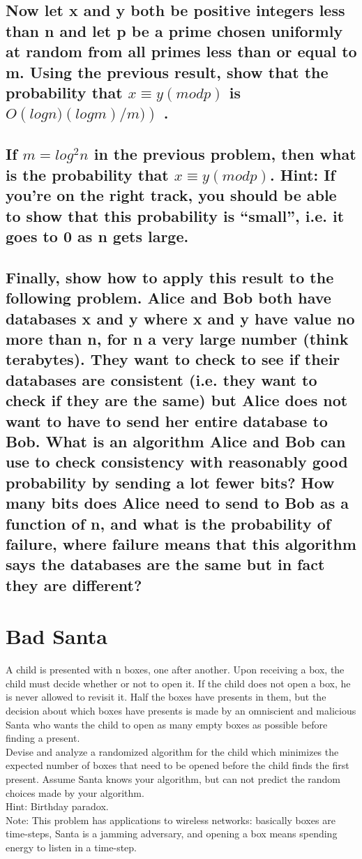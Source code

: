 \documentclass[titlepage]{article}\usepackage[]{graphicx}\usepackage[]{color}
\begin{document}
\subsection{ Now let x and y both be positive integers less than n and let p be a prime
chosen uniformly at random from all primes less than or equal to m. Using the
previous result, show that the probability that $ x ≡ y (mod p)$  is $ O\left( log
n)(log m)/m)\right)$ . }

\subsection{ If $ m = log^2 n$  in the previous problem, then what is the probability that
$x ≡ y (mod p)$. Hint: If you’re on the right track, you should be able to show
that this probability is ``small'', i.e. it goes to 0 as n gets large. }

\subsection{ Finally, show how to apply this result to the following problem. Alice and
Bob both have databases x and y where x and y have value no more than n, for n
a very large number (think terabytes). They want to check to see if their
databases are consistent (i.e. they want to check if they are the same) but
Alice does not want to have to send her entire database to Bob. What is an
algorithm Alice and Bob can use to check consistency with reasonably good
probability by sending a lot fewer bits? How many bits does Alice need to send
to Bob as a function of n, and what is the probability of failure, where
failure means that this algorithm says the databases are the same but in fact
they are different? }


\section{Bad Santa }
A child is presented with n boxes, one after another. Upon receiving
a box, the child must decide whether or not to open it. If the child does not
open a box, he is never allowed to revisit it. Half the
boxes have presents in them, but the decision about which boxes have presents
is made by an omniscient and malicious Santa who wants the child to open as
many empty boxes as possible before finding a present. \\ 
Devise and analyze a randomized algorithm for the child which minimizes the
expected number of boxes that need to be opened before the child finds the
first present. Assume Santa knows your algorithm, but can not predict the
random choices made by your algorithm. \\ 
Hint: Birthday paradox. \\
Note: This problem has applications to wireless networks: basically boxes are
time-steps, Santa is a jamming adversary, and opening a box means spending
energy to listen in a time-step.
\end{document}
